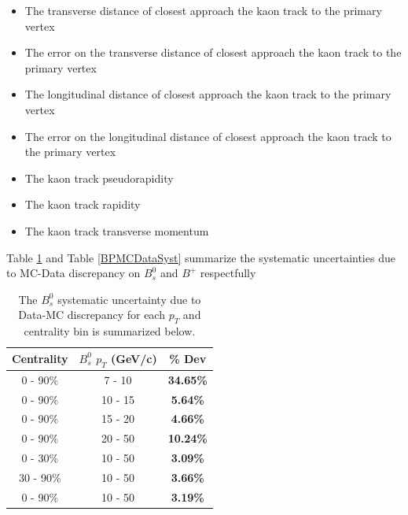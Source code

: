 \begin{itemize}
\item The transverse distance of closest approach the kaon track to the primary vertex
\item The error on the transverse distance of closest approach the kaon track to the primary vertex
\item The longitudinal distance of closest approach the kaon track to the primary vertex
\item The error on the longitudinal distance of closest approach the kaon track to the primary vertex
\item The kaon track pseudorapidity 
\item The kaon track rapidity 
\item The kaon track transverse momentum 
\end{itemize}


Table \ref{BsMCDataSyst} and Table \ref{BPMCDataSyst} summarize the systematic uncertainties due to MC-Data discrepancy on $B^0_s$ and $B^+$ respectfully


\begin{table}[h]
\begin{center}
\caption{The $B^0_s$ systematic uncertainty due to Data-MC discrepancy for each $p_T$ and centrality bin is summarized below.}
\vspace{1em}
\label{BsMCDataSyst}
  \begin{tabular}{| c | c |c |}
    \hline
     Centrality & $B^0_s$ $p_T$ (GeV/c) & \% Dev \\
    \hline
    \hline
0 - 90\% & 7 - 10 &   \textbf{34.65\% }     \\ 
0 - 90\% & 10 - 15 & \textbf{5.64\% }    \\ 
0 - 90\% & 15 - 20 &  \textbf{4.66\% }     \\ 
0 - 90\% & 20 - 50 &  \textbf{10.24\% }    \\ 
0 - 30\% & 10 - 50 &   \textbf{3.09\% }  \\ 
30 - 90\% & 10 - 50 & \textbf{3.66\% }    \\ 
0 - 90\% & 10 - 50 &  \textbf{3.19\% }   \\ 
    \hline
    \hline
\end{tabular}
\end{center}
\end{table}



